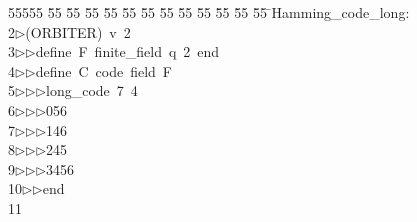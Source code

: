 %
%
\begin{tabbing}
55555 \= 55 \= 55 \= 55 \= 55 \= 55 \= 55 \= 55 \= 55 \= 55 \= 55 \= 55 \= 55 \= \>Hamming\_code\_long:\\[0pt]
2\>$\triangleright$\>(ORBITER)\ v\ 2\ \\[0pt]
3\>$\triangleright$\>$\triangleright$\>define\ F\ finite\_field\ q\ 2\ end\ \\[0pt]
4\>$\triangleright$\>$\triangleright$\>define\ C\ code\ field\ F\ \\[0pt]
5\>$\triangleright$\>$\triangleright$\>$\triangleright$\>long\_code\ 7\ 4\ \\[0pt]
6\>$\triangleright$\>$\triangleright$\>$\triangleright$\>056\ \\[0pt]
7\>$\triangleright$\>$\triangleright$\>$\triangleright$\>146\ \\[0pt]
8\>$\triangleright$\>$\triangleright$\>$\triangleright$\>245\ \\[0pt]
9\>$\triangleright$\>$\triangleright$\>$\triangleright$\>3456\ \\[0pt]
10\>$\triangleright$\>$\triangleright$\>end\ \\[0pt]
11\>\end{tabbing}
